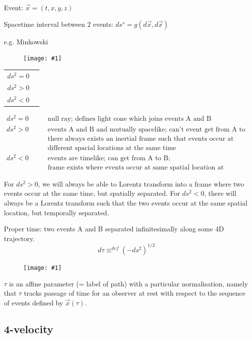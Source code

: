 \documentclass[a4paper]{article} %
\renewcommand{\picture}[1]
{
\begin{figure}[h]
\centering
\texttt{[image: \#1]}
\end{figure}
}
\begin{document}
Event: $\vec{x}=(t,x,y,z)$

Spacetime interval between 2 events: $ds^s=g(d\vec{x},d\vec{x})$

e.g. Minkowski

\picture{images/lightcone.png}

\begin{table}[h]
\centering
\begin{tabular}{l l}
$ds^2=0$ & \\
$ds^2>0$ & \\
$ds^2<0$ & 
\end{tabular}
\end{table}

\begin{align*}
ds^2=0\qquad &\text{null ray; defines light cone which joins events A and B}\\
ds^2>0\qquad &\text{events A and B and mutually spacelike; can't event get from A to B;}\\
\qquad&\text{there always exists an inertial frame such that events occur at}\\
\qquad&\text{different spacial locations at the same time}\\
ds^2<0 \qquad& \text{events are timelike; can get from A to B;}\\
\qquad &\text{frame exists where events occur at same spatial location at different times}
\end{align*}

For $ds^2>0$, we will always be able to Lorentz transform into a frame where two events occur at the same time, but spatially separated. For $ds^2<0$, there will always be a Lorentz transform such that the two events occur at the same spatial location, but temporally separated.

Proper time: two events A and B separated infinitesimally along some 4D trajectory.
\begin{equation}
d\tau \equiv^{def}(-ds^2)^{1/2}
\end{equation}

\picture{images/propertime_path}


$\tau$ is an affine parameter (= label of path) with a particular normalisation, namely that $\tau$ tracks passage of time for an observer at rest with respect to the sequence of events defined by $\vec{x}(\tau)$.

\subsection{4-velocity}
\end{document}
